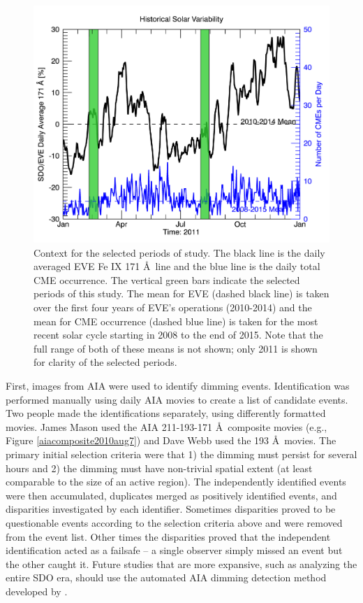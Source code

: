 \begin{figure}[!h]
    \begin{center}
	    \includegraphics[width=150mm]{Images/FourWeekContext.png}
    \end{center}
    \caption[Selected four week period in historical context]{
        Context for the selected periods of study. The black line is the daily averaged EVE Fe IX 171 \AA\ line and the 
        blue line is the daily total CME occurrence. The vertical green bars indicate the selected periods of this study.
        The mean for EVE (dashed black line) is taken over the first four years of EVE's operations (2010-2014) and the 
        mean for CME occurrence (dashed blue line) is taken for the most recent solar cycle starting in 2008 to the end of 
        2015. Note that the full range of both of these means is not shown; only 2011 is shown for clarity of the selected
        periods. 
	}
    \label{fig:historicalcontext}
\end{figure}
 
First, images from AIA were used to identify dimming events. Identification was performed manually using daily AIA movies to create a list of candidate events. Two people made the identifications separately, using differently formatted movies. James Mason used the AIA 211-193-171 \AA\ composite movies (e.g., Figure \ref{aiacomposite2010aug7}) and Dave Webb used the 193 \AA\ movies. The primary initial selection criteria were that 1) the dimming must persist for several hours and 2) the dimming must have non-trivial spatial extent (at least comparable to the size of an active region). The independently identified events were then accumulated, duplicates merged as positively identified events, and disparities investigated by each identifier. Sometimes disparities proved to be questionable events according to the selection criteria above and were removed from the event list. Other times the disparities proved that the independent identification acted as a failsafe -- a single observer simply missed an event but the other caught it. Future studies that are more expansive, such as analyzing the entire SDO era, should use the automated AIA dimming detection method developed by \citet{Krista2013a}. 
 
